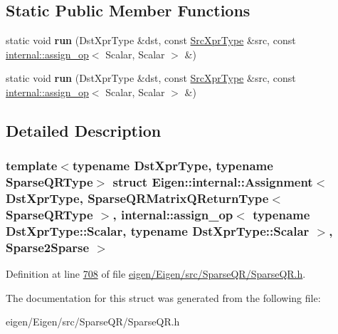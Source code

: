 \subsection*{Static Public Member Functions}
\begin{DoxyCompactItemize}
\item 
\mbox{\label{struct_eigen_1_1internal_1_1_assignment_3_01_dst_xpr_type_00_01_sparse_q_r_matrix_q_return_type_359637caee80b00c35b5e63bb0a6509c_a18b3b76ddaa1791e72d847be2d137961}} 
static void {\bfseries run} (Dst\+Xpr\+Type \&dst, const \hyperlink{struct_eigen_1_1_sparse_q_r_matrix_q_return_type}{Src\+Xpr\+Type} \&src, const \hyperlink{struct_eigen_1_1internal_1_1assign__op}{internal\+::assign\+\_\+op}$<$ Scalar, Scalar $>$ \&)
\item 
\mbox{\label{struct_eigen_1_1internal_1_1_assignment_3_01_dst_xpr_type_00_01_sparse_q_r_matrix_q_return_type_359637caee80b00c35b5e63bb0a6509c_a18b3b76ddaa1791e72d847be2d137961}} 
static void {\bfseries run} (Dst\+Xpr\+Type \&dst, const \hyperlink{struct_eigen_1_1_sparse_q_r_matrix_q_return_type}{Src\+Xpr\+Type} \&src, const \hyperlink{struct_eigen_1_1internal_1_1assign__op}{internal\+::assign\+\_\+op}$<$ Scalar, Scalar $>$ \&)
\end{DoxyCompactItemize}


\subsection{Detailed Description}
\subsubsection*{template$<$typename Dst\+Xpr\+Type, typename Sparse\+Q\+R\+Type$>$\newline
struct Eigen\+::internal\+::\+Assignment$<$ Dst\+Xpr\+Type, Sparse\+Q\+R\+Matrix\+Q\+Return\+Type$<$ Sparse\+Q\+R\+Type $>$, internal\+::assign\+\_\+op$<$ typename Dst\+Xpr\+Type\+::\+Scalar, typename Dst\+Xpr\+Type\+::\+Scalar $>$, Sparse2\+Sparse $>$}



Definition at line \hyperlink{eigen_2_eigen_2src_2_sparse_q_r_2_sparse_q_r_8h_source_l00708}{708} of file \hyperlink{eigen_2_eigen_2src_2_sparse_q_r_2_sparse_q_r_8h_source}{eigen/\+Eigen/src/\+Sparse\+Q\+R/\+Sparse\+Q\+R.\+h}.



The documentation for this struct was generated from the following file\+:\begin{DoxyCompactItemize}
\item 
eigen/\+Eigen/src/\+Sparse\+Q\+R/\+Sparse\+Q\+R.\+h\end{DoxyCompactItemize}
